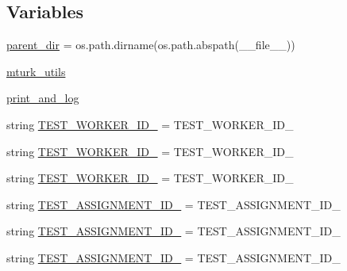 \subsection*{Variables}
\begin{DoxyCompactItemize}
\item 
\hyperlink{namespaceparlai_1_1mturk_1_1core_1_1test_1_1test__mturk__manager_a7a34534d8078c3c36d67c7cfc8b6edc3}{parent\+\_\+dir} = os.\+path.\+dirname(os.\+path.\+abspath(\+\_\+\+\_\+file\+\_\+\+\_\+))
\item 
\hyperlink{namespaceparlai_1_1mturk_1_1core_1_1test_1_1test__mturk__manager_a5d8b8b2ab4512de011c8d7b985ff8865}{mturk\+\_\+utils}
\item 
\hyperlink{namespaceparlai_1_1mturk_1_1core_1_1test_1_1test__mturk__manager_a62354e8f523e1d455dc47348ff3942ef}{print\+\_\+and\+\_\+log}
\item 
string \hyperlink{namespaceparlai_1_1mturk_1_1core_1_1test_1_1test__mturk__manager_a35e13b4454b8890a92ca088c510f3fff}{T\+E\+S\+T\+\_\+\+W\+O\+R\+K\+E\+R\+\_\+\+I\+D\+\_} = \textquotesingle{}T\+E\+S\+T\+\_\+\+W\+O\+R\+K\+E\+R\+\_\+\+I\+D\+\_\textquotesingle{}
\item 
string \hyperlink{namespaceparlai_1_1mturk_1_1core_1_1test_1_1test__mturk__manager_aef8a260d38522ebf92eea2ec353ca23d}{T\+E\+S\+T\+\_\+\+W\+O\+R\+K\+E\+R\+\_\+\+I\+D\+\_} = \textquotesingle{}T\+E\+S\+T\+\_\+\+W\+O\+R\+K\+E\+R\+\_\+\+I\+D\+\_\textquotesingle{}
\item 
string \hyperlink{namespaceparlai_1_1mturk_1_1core_1_1test_1_1test__mturk__manager_a1f61de3cf44860aaee5c291207e77101}{T\+E\+S\+T\+\_\+\+W\+O\+R\+K\+E\+R\+\_\+\+I\+D\+\_} = \textquotesingle{}T\+E\+S\+T\+\_\+\+W\+O\+R\+K\+E\+R\+\_\+\+I\+D\+\_\textquotesingle{}
\item 
string \hyperlink{namespaceparlai_1_1mturk_1_1core_1_1test_1_1test__mturk__manager_a28adaf8b54cba81a6dbe666d72b2a006}{T\+E\+S\+T\+\_\+\+A\+S\+S\+I\+G\+N\+M\+E\+N\+T\+\_\+\+I\+D\+\_} = \textquotesingle{}T\+E\+S\+T\+\_\+\+A\+S\+S\+I\+G\+N\+M\+E\+N\+T\+\_\+\+I\+D\+\_\textquotesingle{}
\item 
string \hyperlink{namespaceparlai_1_1mturk_1_1core_1_1test_1_1test__mturk__manager_aaf557669c599a71fe0d5fedfce849ac5}{T\+E\+S\+T\+\_\+\+A\+S\+S\+I\+G\+N\+M\+E\+N\+T\+\_\+\+I\+D\+\_} = \textquotesingle{}T\+E\+S\+T\+\_\+\+A\+S\+S\+I\+G\+N\+M\+E\+N\+T\+\_\+\+I\+D\+\_\textquotesingle{}
\item 
string \hyperlink{namespaceparlai_1_1mturk_1_1core_1_1test_1_1test__mturk__manager_adb8d9a17cdcea80388d98f1f205babf1}{T\+E\+S\+T\+\_\+\+A\+S\+S\+I\+G\+N\+M\+E\+N\+T\+\_\+\+I\+D\+\_} = \textquotesingle{}T\+E\+S\+T\+\_\+\+A\+S\+S\+I\+G\+N\+M\+E\+N\+T\+\_\+\+I\+D\+\_\textquotesingle{}

\end{DoxyCompactItemize}
